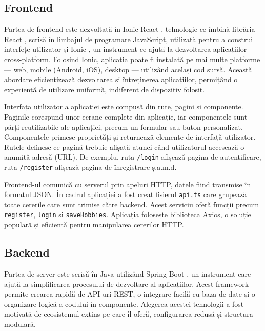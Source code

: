 \subsection{Frontend}
\label{subsec:ch4sec1sub1}

Partea de frontend este dezvoltată în Ionic React \cite{ionicreactdocs}, tehnologie ce îmbină librăria React \cite{reactdocs}, scrisă în limbajul de programare JavaScript, 
utilizată pentru a construi interfețe utilizator și Ionic \cite{ionicdocs}, un instrument ce ajută la dezvoltarea aplicațiilor cross-platform. 
Folosind Ionic, aplicația poate fi instalată pe mai multe platforme --- web, mobile (Android, iOS), desktop --- utilizând același cod sursă. 
Această abordare eficientizează dezvoltarea și întreținerea aplicațiilor, permițând o experiență de utilizare uniformă, indiferent de dispozitiv folosit. 
\par
Interfața utilizator a aplicației este compusă din rute, pagini și componente. 
Paginile corespund unor ecrane complete din aplicație, iar componentele sunt părți reutilizabile ale aplicației, precum un formular sau buton personalizat.
Componentele primesc proprietăți și returnează elemente de interfață utilizator.
Rutele definesc ce pagină trebuie afișată atunci când utilizatorul accesează o anumită adresă (URL). 
De exemplu, ruta \texttt{/login} afișează pagina de autentificare, ruta \texttt{/register} afișează pagina de înregistrare ș.a.m.d.

\par
Frontend-ul comunică cu serverul prin apeluri HTTP, datele fiind transmise în formatul JSON.
În cadrul aplicației a fost creat fișierul \texttt{api.ts} care grupează toate cererile care sunt trimise către backend. 
Acest serviciu oferă funcții precum \texttt{register}, \texttt{login} și \texttt{saveHobbies}.
Aplicația folosește biblioteca Axios, o soluție populară și eficientă pentru manipularea cererilor HTTP.


\subsection{Backend}
\label{subsec:ch4sec1sub2}
Partea de server este scrisă în Java utilizând Spring Boot \cite{springbootdocs}, un instrument care ajută la simplificarea procesului de dezvoltare al aplicațiilor.
Acest framework permite crearea rapidă de API-uri REST, o integrare facilă cu baza de date și o organizare logică a codului în componente. Alegerea
acestei tehnologii a fost motivată de ecosistemul extins pe care îl oferă, configurarea redusă și structura modulară. 

